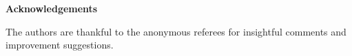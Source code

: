 \documentclass{article}
\numberwithin{theorem}{section}
\newtheorem{question}[theorem]{Question}
\newcommand{\RCA}[0]{\mathsf{RCA}}
\newcommand{\EM}[0]{\mathsf{EM}}
\newcommand{\RT}[0]{\mathsf{RT}}
\newcommand{\NN}[0]{\mathbb{N}}
\begin{document}








\bigskip
\begin{center}
\textbf{Acknowledgements}
\end{center}
The authors are thankful to the anonymous referees for insightful comments and improvement suggestions.



\end{document}
